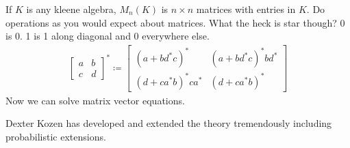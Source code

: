 \documentclass[../598comp.tex]{subfiles}
\begin{document}
\begin{example}
  If $K$ is any kleene algebra, $M_n(K)$ is $n \times n$ matrices with entries
  in $K$. Do operations as you would expect about matrices. What the heck is
  star though?
  0 is 0. 1 is 1 along diagonal and 0 everywhere else.
  \begin{gather*}
    \begin{bmatrix}
      a & b \\
      c & d
    \end{bmatrix}^*
    \coloneqq
    \begin{bmatrix}
      (a + bd^*c)^* & (a + bd^*c)^*bd^* \\
      (d + ca^*b)^*ca^* & (d + ca^*b)^*
    \end{bmatrix}
  \end{gather*}
  Now we can solve matrix vector equations.
\end{example}

Dexter Kozen has developed and extended the theory tremendously including
probabilistic extensions.
\end{document}
